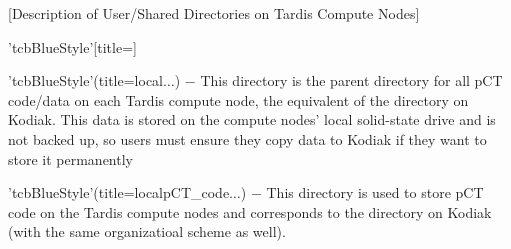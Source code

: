 \clearpage%
[Description of User/Shared Directories on Tardis Compute Nodes]
\begin{tcbfunctionenv}'tcbBlueStyle'[title=]%
\begin{tcbparagraph}'tcbBlueStyle'(title=\dirsep local\dirsep$\dots$)%
	$\boldsymbol{-}$ This directory is the parent directory for all pCT code/data on each Tardis compute node, the equivalent of the  directory on Kodiak.  This data is stored on the compute nodes' local solid-state drive and is not backed up, so users must ensure they copy data to Kodiak if they want to store it permanently
\end{tcbparagraph}
\begin{tcbparagraph}'tcbBlueStyle'(title=\dirsep local\dirsep pCT\_code\dirsep $\dots$)
$\boldsymbol{-}$ This directory is used to store pCT code on the Tardis compute nodes and corresponds to the  directory on Kodiak (with the same organizatioal scheme as well).
\end{tcbparagraph}

\end{tcbfunctionenv}
